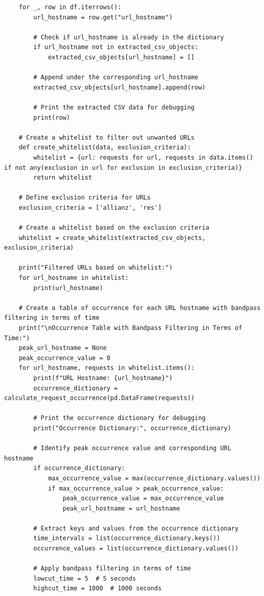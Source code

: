 \begin{lstlisting}
    for _, row in df.iterrows():
        url_hostname = row.get("url_hostname")

        # Check if url_hostname is already in the dictionary
        if url_hostname not in extracted_csv_objects:
            extracted_csv_objects[url_hostname] = []

        # Append under the corresponding url_hostname
        extracted_csv_objects[url_hostname].append(row)

        # Print the extracted CSV data for debugging
        print(row)

    # Create a whitelist to filter out unwanted URLs
    def create_whitelist(data, exclusion_criteria):
        whitelist = {url: requests for url, requests in data.items() if not any(exclusion in url for exclusion in exclusion_criteria)}
        return whitelist

    # Define exclusion criteria for URLs
    exclusion_criteria = ['allianz', 'res']

    # Create a whitelist based on the exclusion criteria
    whitelist = create_whitelist(extracted_csv_objects, exclusion_criteria)

    print("Filtered URLs based on whitelist:")
    for url_hostname in whitelist:
        print(url_hostname)

    # Create a table of occurrence for each URL hostname with bandpass filtering in terms of time
    print("\nOccurrence Table with Bandpass Filtering in Terms of Time:")
    peak_url_hostname = None
    peak_occurrence_value = 0
    for url_hostname, requests in whitelist.items():
        print(f"URL Hostname: {url_hostname}")
        occurrence_dictionary = calculate_request_occurrence(pd.DataFrame(requests))

        # Print the occurrence dictionary for debugging
        print("Occurrence Dictionary:", occurrence_dictionary)

        # Identify peak occurrence value and corresponding URL hostname
        if occurrence_dictionary:
            max_occurrence_value = max(occurrence_dictionary.values())
            if max_occurrence_value > peak_occurrence_value:
                peak_occurrence_value = max_occurrence_value
                peak_url_hostname = url_hostname

        # Extract keys and values from the occurrence dictionary
        time_intervals = list(occurrence_dictionary.keys())
        occurrence_values = list(occurrence_dictionary.values())

        # Apply bandpass filtering in terms of time
        lowcut_time = 5  # 5 seconds
        highcut_time = 1000  # 1000 seconds


\end{lstlisting}
